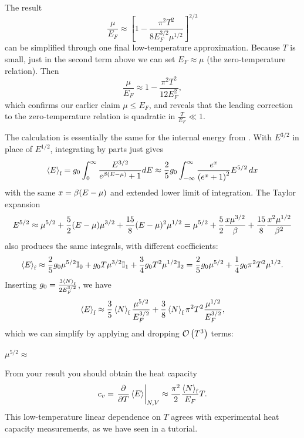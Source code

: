 The result
\begin{equation*}
  \frac{\mu}{E_F} \approx \left[1 - \frac{\pi^2 T^2}{8 E_F^{3 / 2} \mu^{1 / 2}}\right]^{2 / 3}
\end{equation*}
can be simplified through one final low-temperature approximation.
Because $T$ is small, just in the second term above we can set $E_F \approx \mu$ (the zero-temperature relation).
Then
\begin{equation}
  \label{eq:mu_vs_T}
  \frac{\mu}{E_F} \approx 1 - \frac{\pi^2 T^2}{12 E_F^2},
\end{equation}
which confirms our earlier claim $\mu \leq E_F$, and reveals that the leading correction to the zero-temperature relation is quadratic in $\frac{T}{E_F} \ll 1$.

The calculation is essentially the same for the internal energy from .
With $E^{3 / 2}$ in place of $E^{1 / 2}$, integrating by parts just gives
\begin{equation*}
  \left\langle E \right\rangle_{\text{f}} = g_0 \int_0^{\infty} \frac{E^{3 / 2}}{e^{\beta(E - \mu)} + 1} dE \approx \frac{2}{5} g_0 \int_{-\infty}^{\infty} \frac{e^x}{\left(e^x + 1\right)^2} E^{5 / 2} \mathop{dx}
\end{equation*}
with the same $x = \beta(E - \mu)$ and extended lower limit of integration.
The Taylor expansion
\begin{equation*}
  E^{5 / 2} \approx \mu^{5 / 2} + \frac{5}{2} (E - \mu) \mu^{3 / 2} + \frac{15}{8} (E - \mu)^2 \mu^{1 / 2} = \mu^{5 / 2} + \frac{5}{2} \frac{x \mu^{3 / 2}}{\beta} + \frac{15}{8} \frac{x^2 \mu^{1 / 2}}{\beta^2}
\end{equation*}
also produces the same integrals, with different coefficients:
\begin{equation*}
  \left\langle E \right\rangle_{\text{f}} \approx \frac{2}{5} g_0 \mu^{5 / 2} \mathbb I_0 + g_0 T \mu^{3 / 2} \mathbb I_1 + \frac{3}{4} g_0 T^2 \mu^{1 / 2} \mathbb I_2 = \frac{2}{5} g_0 \mu^{5 / 2} + \frac{1}{4} g_0 \pi^2 T^2 \mu^{1 / 2}.
\end{equation*}
Inserting $g_0 = \frac{3\left\langle N \right\rangle_{\text{f}}}{2E_F^{3 / 2}}$, we have
\begin{equation*}
  \left\langle E \right\rangle_{\text{f}} \approx \frac{3}{5} \left\langle N \right\rangle_{\text{f}} \frac{\mu^{5 / 2}}{E_F^{3 / 2}} + \frac{3}{8} \left\langle N \right\rangle_{\text{f}} \pi^2 T^2 \frac{\mu^{1 / 2}}{E_F^{3 / 2}},
\end{equation*}
which we can simplify by applying  and dropping $\mathcal O\left(T^3\right)$ terms:
\begin{mdframed}
  $\displaystyle \mu^{5 / 2} \approx $ \\[100 pt]
\end{mdframed}
From your result you should obtain the heat capacity
\begin{equation*}
  c_v = \left. \frac{\partial }{\partial T} \left\langle E \right\rangle \right|_{N,V} \approx \frac{\pi^2}{2} \frac{\left\langle N \right\rangle_{\text{f}}}{E_F} T.
\end{equation*}
This low-temperature linear dependence on $T$ agrees with experimental heat capacity measurements, as we have seen in a tutorial.

